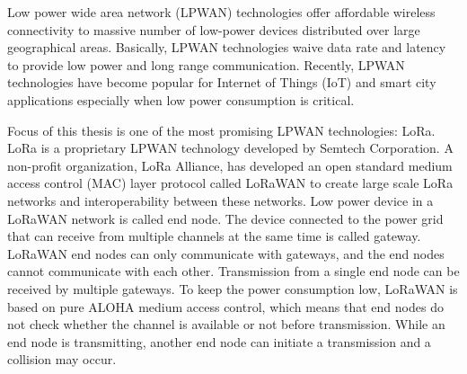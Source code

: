 Low power wide area network (LPWAN) technologies offer affordable wireless connectivity to massive number of low-power devices distributed over large geographical areas. Basically, LPWAN technologies waive data rate and latency to provide low power and long range communication. Recently, LPWAN technologies have become popular for Internet of Things (IoT) and smart city applications especially when low power consumption is critical.

Focus of this thesis is one of the most promising LPWAN technologies: LoRa. LoRa is a proprietary LPWAN technology developed by Semtech Corporation. A non-profit organization, LoRa Alliance, has developed an open standard medium access control (MAC) layer protocol called LoRaWAN to create large scale LoRa networks and interoperability between these networks. Low power device in a LoRaWAN network is called end node. The device connected to the power grid that can receive from multiple channels at the same time is called gateway. LoRaWAN end nodes can only communicate with gateways, and the end nodes cannot communicate with each other. Transmission from a single end node can be received by multiple gateways. To keep the power consumption low, LoRaWAN is based on pure ALOHA medium access control, which means that end nodes do not check whether the channel is available or not before transmission. While an end node is transmitting, another end node can initiate a transmission and a collision may occur.

